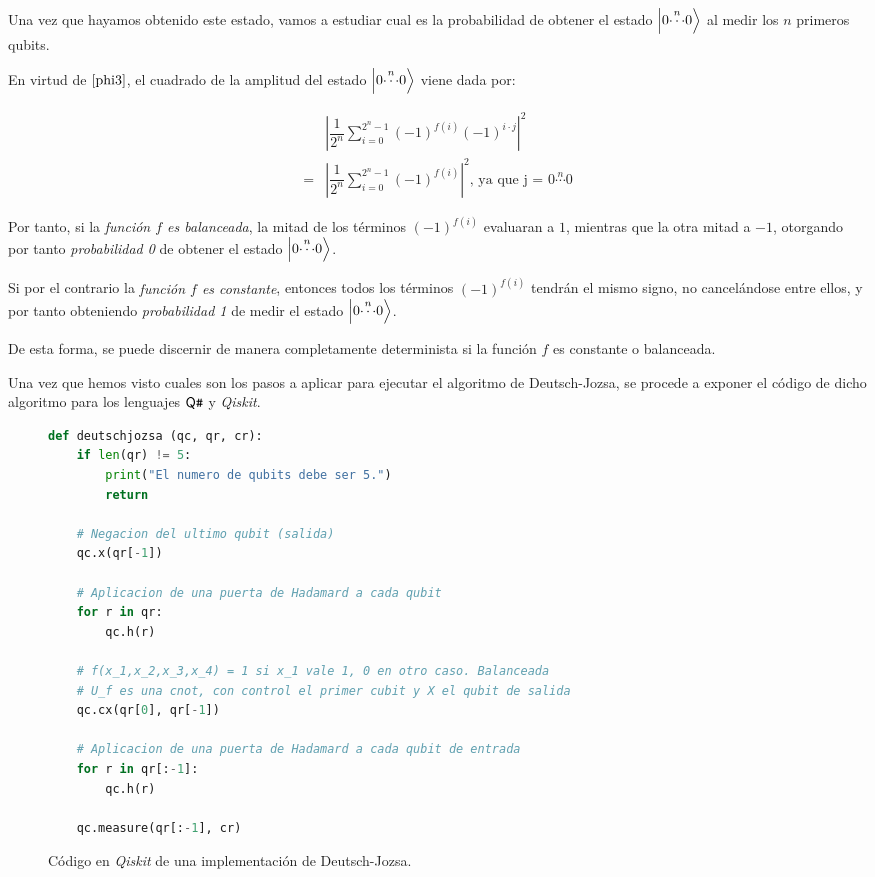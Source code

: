 Una vez que hayamos obtenido este estado, vamos a estudiar cual es la probabilidad de obtener el estado $\left|0\overset{n}{\cdots}0\right\rangle$ al medir los $n$ primeros qubits.

En virtud de $\ref{phi3}$, el cuadrado de la amplitud del estado $\left|0\overset{n}{\cdots}0\right\rangle$ viene dada por:

\begin{equation}
\begin{split}
& \left|\dfrac{1}{2^n}\sum\limits_{i=0}^{2^n - 1}(-1)^{f(i)}(-1)^{i\cdot j}\right|^2 \\ 
= &\left|\dfrac{1}{2^n}\sum\limits_{i=0}^{2^n - 1}(-1)^{f(i)}\right|^2 \textrm{, ya que j = $0\overset{n}{\cdots}0$}
\end{split}
\end{equation}

Por tanto, si la \emph{función $f$ es balanceada}, la mitad de los términos $(-1)^{f(i)}$ evaluaran a $1$, mientras que la otra mitad a $-1$, otorgando por tanto \emph{probabilidad 0} de obtener el estado 
$\left|0\overset{n}{\cdots}0\right\rangle$.

Si por el contrario la \emph{función $f$ es constante}, entonces todos los términos $(-1)^{f(i)}$ tendrán el mismo signo, no cancelándose entre ellos, y por tanto obteniendo \emph{probabilidad 1} de medir el estado $\left|0\overset{n}{\cdots}0\right\rangle$.

De esta forma, se puede discernir de manera completamente determinista si la función $f$ es constante o balanceada.

Una vez que hemos visto cuales son los pasos a aplicar para ejecutar el algoritmo de Deutsch-Jozsa, se procede a exponer el código de dicho algoritmo para los lenguajes $\textsf{Q}\texttt{\#}$ y \textit{Qiskit}.



\begin{figure}[htb]
\begin{lstlisting}[language=Python]
def deutschjozsa (qc, qr, cr):
    if len(qr) != 5:
        print("El numero de qubits debe ser 5.")
        return
    
    # Negacion del ultimo qubit (salida)
    qc.x(qr[-1])
    
    # Aplicacion de una puerta de Hadamard a cada qubit
    for r in qr:
        qc.h(r)
        
    # f(x_1,x_2,x_3,x_4) = 1 si x_1 vale 1, 0 en otro caso. Balanceada
    # U_f es una cnot, con control el primer cubit y X el qubit de salida
    qc.cx(qr[0], qr[-1])
    
    # Aplicacion de una puerta de Hadamard a cada qubit de entrada
    for r in qr[:-1]:
        qc.h(r)
    
    qc.measure(qr[:-1], cr)
\end{lstlisting}
\caption{Código en \textit{Qiskit} de una implementación de Deutsch-Jozsa.}
\label{fig:code61}
\end{figure}

